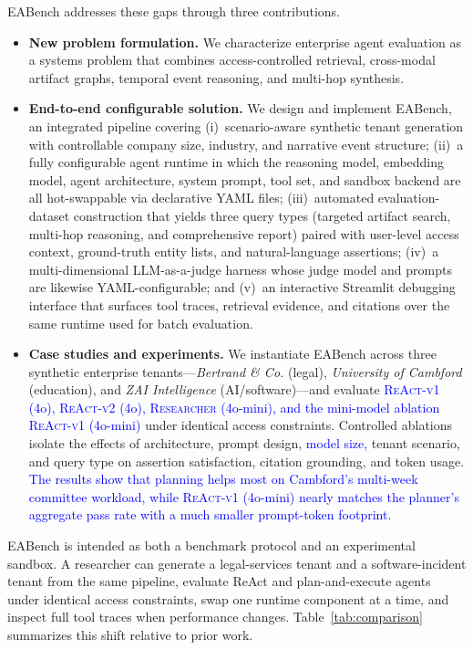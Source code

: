 \documentclass[journal,dvipsnames]{acmart}
\begin{document}
EABench addresses these gaps through three contributions.
\begin{itemize}
\item \textbf{New problem formulation.} We characterize enterprise agent evaluation as a systems problem that combines access-controlled retrieval, cross-modal artifact graphs, temporal event reasoning, and multi-hop synthesis.

\item \textbf{End-to-end configurable solution.} We design and implement EABench, an integrated pipeline covering (i)~scenario-aware synthetic tenant generation with controllable company size, industry, and narrative event structure; (ii)~a fully configurable agent runtime in which the reasoning model, embedding model, agent architecture, system prompt, tool set, and sandbox backend are all hot-swappable via declarative YAML files; (iii)~automated evaluation-dataset construction that yields three query types (targeted artifact search, multi-hop reasoning, and comprehensive report) paired with user-level access context, ground-truth entity lists, and natural-language assertions; (iv)~a multi-dimensional LLM-as-a-judge harness whose judge model and prompts are likewise YAML-configurable; and (v)~an interactive Streamlit debugging interface that surfaces tool traces, retrieval evidence, and citations over the same runtime used for batch evaluation.

\item \textbf{Case studies and experiments.} We instantiate EABench across three synthetic enterprise tenants---\emph{Bertrand \& Co.} (legal), \emph{University of Cambford} (education), and \emph{ZAI Intelligence} (AI/software)---and evaluate \textcolor{blue}{\textsc{ReAct-v1} (4o), \textsc{ReAct-v2} (4o), \textsc{Researcher} (4o-mini), and the mini-model ablation \textsc{ReAct-v1} (4o-mini)} under identical access constraints. Controlled ablations isolate the effects of architecture, prompt design, \textcolor{blue}{model size,} tenant scenario, and query type on assertion satisfaction, citation grounding, and token usage. \textcolor{blue}{The results show that planning helps most on Cambford's multi-week committee workload, while \textsc{ReAct-v1} (4o-mini) nearly matches the planner's aggregate pass rate with a much smaller prompt-token footprint.}
\end{itemize}


EABench is intended as both a benchmark protocol and an experimental sandbox. A researcher can generate a legal-services tenant and a software-incident tenant from the same pipeline, evaluate ReAct and plan-and-execute agents under identical access constraints, swap one runtime component at a time, and inspect full tool traces when performance changes. Table~\ref{tab:comparison} summarizes this shift relative to prior work.
\end{document}
